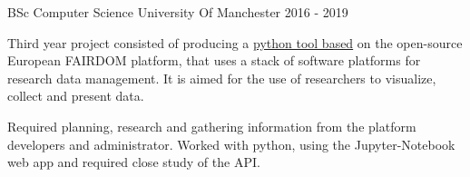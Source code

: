 \cventry
    {BSc Computer Science} %
    {University Of Manchester} %
    {} %
    {2016 - 2019} %
    {\begin{cvitems}
        \item{Third year project consisted of producing a \href{https://github.com/bogdan23a/TheSeekNotebook}{python tool based} on the open-source European FAIRDOM platform, that
        uses a stack of software platforms for research data management. It is aimed for the use of researchers to
        visualize, collect and present data.}
        \item{Required planning, research and gathering information from the platform developers and administrator.
        Worked with python, using the Jupyter-Notebook web app and required close study of the API.}
    \end{cvitems}}